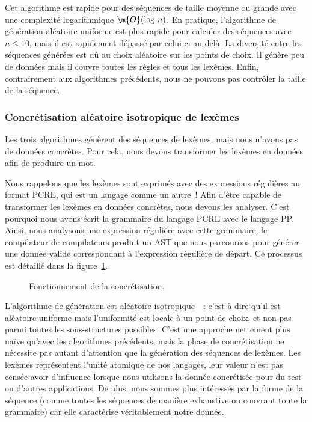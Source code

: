 Cet algorithme est rapide pour des séquences de taille moyenne ou grande avec
une complexité logarithmique $\m{O}(\mathrm{log}~n)$. En pratique, l'algorithme
de génération aléatoire uniforme est plus rapide pour calculer des séquences
avec $n \leq 10$, mais il est rapidement dépassé par celui-ci au-delà. La
diversité entre les séquences générées est dû au choix aléatoire sur les points
de choix. Il génère peu de données mais il couvre toutes les règles et tous les
lexèmes. Enfin, contrairement aux algorithmes précédents, nous ne pouvons pas
contrôler la taille de la séquence.

\subsubsection{Concrétisation aléatoire isotropique de lexèmes}
\label{subsection:data:isotropic_generation}

Les trois algorithmes génèrent des séquences de lexèmes, mais nous n'avons pas
de données concrètes. Pour cela, nous devons transformer les lexèmes en données
afin de produire un mot.

Nous rappelons que les lexèmes sont exprimés avec des expressions régulières au
format PCRE, qui est un langage comme un autre~! Afin d'être capable de
transformer les lexèmes en données concrètes, nous devons les analyser. C'est
pourquoi nous avons écrit la grammaire du langage PCRE avec le langage PP.
Ainsi, nous analysons une expression régulière avec cette grammaire, le
compilateur de compilateurs produit un AST que nous parcourons pour générer une
donnée valide correspondant à l'expression régulière de départ. Ce processus est
détaillé dans la figure~\ref{figure:data:regex}.
%
\begin{figure}


\caption{\label{figure:data:regex} Fonctionnement de la concrétisation.}

\end{figure}
%
L'algorithme de génération est aléatoire isotropique~~: c'est à
dire qu'il est aléatoire uniforme mais l'uniformité est locale à un point de
choix, et non pas parmi toutes les sous-structures possibles. C'est une approche
nettement plus naïve qu'avec les algorithmes précédents, mais la phase de
concrétisation ne nécessite pas autant d'attention que la génération des
séquences de lexèmes. Les lexèmes représentent l'unité atomique de nos langages,
leur valeur n'est pas censée avoir d'influence lorsque nous utilisons la donnée
concrétisée pour du test ou d'autres applications. De plus, nous sommes plus
intéressés par la forme de la séquence (comme toutes les séquences de manière
exhaustive ou couvrant toute la grammaire) car elle caractérise véritablement
notre donnée.

